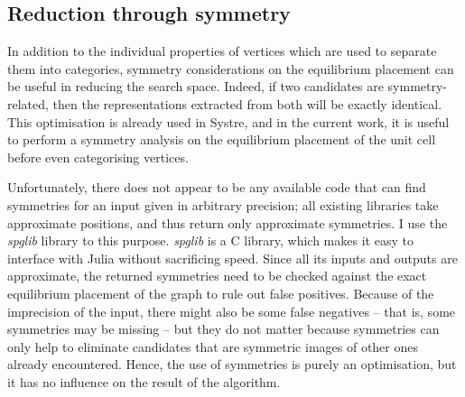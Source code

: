\documentclass[main.tex]{subfiles}
\begin{document}
%

\subsection{Reduction through symmetry}
\label{symmetries}

In addition to the individual properties of vertices which are used to separate them into categories, symmetry considerations on the equilibrium placement can be useful in reducing the search space. Indeed, if two candidates are symmetry-related, then the representations extracted from both will be exactly identical. This optimisation is already used in Systre, and in the current work, it is useful to perform a symmetry analysis on the equilibrium placement of the unit cell before even categorising vertices.

Unfortunately, there does not appear to be any available code that can find symmetries for an input given in arbitrary precision; all existing libraries take approximate positions, and thus return only approximate symmetries. I use the \textit{spglib} library \autocite{spglib} to this purpose. \textit{spglib} is a C library, which makes it easy to interface with Julia without sacrificing speed. Since all its inputs and outputs are approximate, the returned symmetries need to be checked against the exact equilibrium placement of the graph to rule out false positives. Because of the imprecision of the input, there might also be some false negatives -- that is, some symmetries may be missing -- but they do not matter because symmetries can only help to eliminate candidates that are symmetric images of other ones already encountered. Hence, the use of symmetries is purely an optimisation, but it has no influence on the result of the algorithm. %
\end{document}

